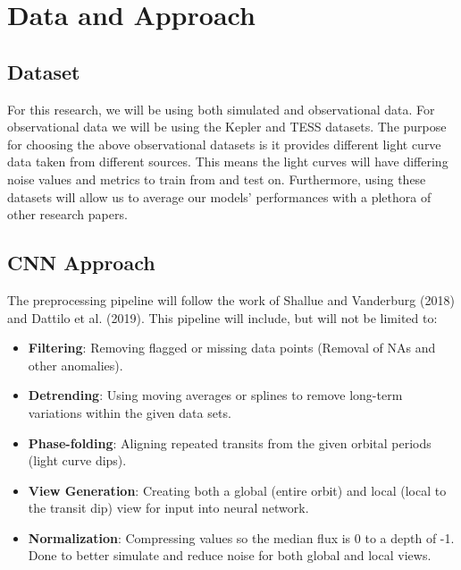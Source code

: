 \documentclass[letterpaper]{article}
\begin{document}
\section*{Data and Approach}
\subsection*{Dataset}
For this research, we will be using both simulated and observational data. For observational data we will be using the Kepler and TESS datasets. The purpose for choosing the above observational datasets is it provides different light curve data taken from different sources. This means the light curves will have differing noise values and metrics to train from and test on. Furthermore, using these datasets will allow us to average our models' performances with a plethora of other research papers.

\subsection*{CNN Approach}
The preprocessing pipeline will follow the work of Shallue and Vanderburg (2018) and Dattilo et al. (2019). This pipeline will include, but will not be limited to:

\begin{itemize}
    \item \textbf{Filtering}: Removing flagged or missing data points (Removal of NAs and other anomalies).
    \item \textbf{Detrending}: Using moving averages or splines to remove long-term variations within the given data sets.
    \item \textbf{Phase-folding}: Aligning repeated transits from the given orbital periods (light curve dips).
    \item \textbf{View Generation}: Creating both a global (entire orbit) and local (local to the transit dip) view for input              into neural network.
    \item \textbf{Normalization}: Compressing values so the median flux is 0 to a depth of -1. Done to better simulate and reduce noise for both global and local views.
\end{itemize}
\end{document}
